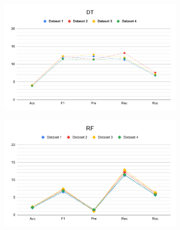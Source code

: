 \begin{figure}
  \ContinuedFloat
  \begin{subfigure}{.9\columnwidth}
    \centering
    \includegraphics[width=0.9\columnwidth]{media/data/performance_delta/delta_DT.pdf}
    \caption{}
    \label{fig:perfromance_delta_dt}
  \end{subfigure}%
\end{figure}

\begin{figure}
  \ContinuedFloat
  \begin{subfigure}{.9\columnwidth}
    \centering
    \includegraphics[width=0.9\columnwidth]{media/data/performance_delta/delta_RF.pdf}
    \caption{}
    \label{fig:perfromance_delta_rf}
  \end{subfigure}%
\end{figure}

